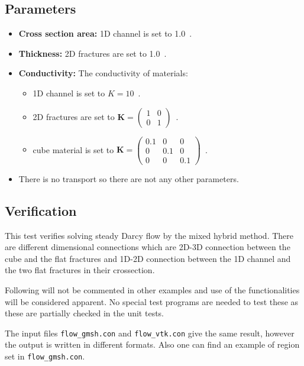 \subsection*{Parameters}
\begin{itemize}
  \item \textbf{Cross section area:} 1D channel is set to 1.0~.
  \item \textbf{Thickness:} 2D fractures are set to 1.0~.
  \item \textbf{Conductivity:} The conductivity of materials:
    \begin{itemize}
      \item 1D channel is set to $K=10$~.
      \item 2D fractures are set to $\mathbf{K}=\left(\begin{array}{cc} 1 & 0 \\ 0 & 1\end{array} \right)$~.
      \item cube material is set to $\mathbf{K}=\left(\begin{array}{ccc} 0.1 & 0 & 0 \\ 0 & 0.1 & 0 \\ 0 & 0 & 0.1\end{array} \right)$~.
    \end{itemize}
  \item There is no transport so there are not any other parameters.
\end{itemize}

\subsection*{Verification}
This test verifies solving steady Darcy flow by the mixed hybrid method. There are different dimensional connections 
which are 2D-3D connection between the cube and the flat fractures and 1D-2D connection between the 1D channel 
and the two flat fractures in their crossection. 

Following will not be commented in other examples and use of the functionalities will be considered apparent. No special test
programs are needed to test these as these are partially checked in the unit tests.

The input files \verb'flow_gmsh.con' and \verb'flow_vtk.con' give the same result, however the output is written in different 
formats. Also one can find an example of region set in \verb'flow_gmsh.con'.

